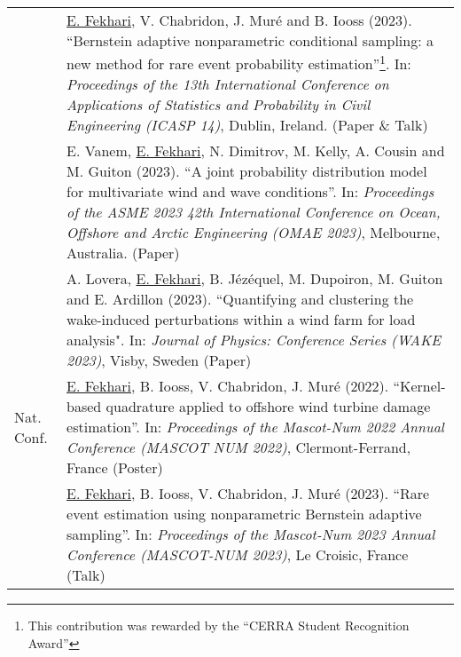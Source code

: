 \begin{center}
\begin{tabularx}{\textwidth}{l X}
                    & \underline{E. Fekhari}, V. Chabridon, J. Muré and B. Iooss (2023). 
                    ``Bernstein adaptive nonparametric conditional sampling: a new method for rare event probability estimation''\footnote{This contribution was rewarded by the ``CERRA Student Recognition Award''}.
                    In: \textit{Proceedings of the 13th International Conference on Applications of Statistics and Probability in Civil Engineering (ICASP 14)}, Dublin, Ireland. (Paper \& Talk)\\
        
                    & E. Vanem, \underline{E. Fekhari}, N. Dimitrov, M. Kelly, A. Cousin and M. Guiton (2023). 
                    ``A joint probability distribution model for multivariate wind and wave conditions''.
                    In: \textit{Proceedings of the ASME 2023 42th International Conference on Ocean, Offshore and Arctic Engineering (OMAE 2023)}, Melbourne, Australia. (Paper)\\
        
                    & A. Lovera, \underline{E. Fekhari}, B. Jézéquel, M. Dupoiron, M. Guiton and E. Ardillon (2023). 
                    ``Quantifying and clustering the wake-induced perturbations within a wind farm for load analysis". 
                    In: \textit{Journal of Physics: Conference Series (WAKE 2023)}, Visby, Sweden (Paper)\\
        \hline
        Nat. Conf.  & \underline{E. Fekhari}, B. Iooss, V. Chabridon, J. Muré (2022).
                    ``Kernel-based quadrature applied to offshore wind turbine damage estimation''. 
                    In: \textit{Proceedings of the Mascot-Num 2022 Annual Conference (MASCOT NUM 2022)}, Clermont-Ferrand, France (Poster)\\
        
                    & \underline{E. Fekhari}, B. Iooss, V. Chabridon, J. Muré (2023).
                    ``Rare event estimation using nonparametric Bernstein adaptive sampling''. 
                    In: \textit{Proceedings of the Mascot-Num 2023 Annual Conference (MASCOT-NUM 2023)}, Le Croisic, France (Talk)\\
                    
        \end{tabularx}    
\end{center}

